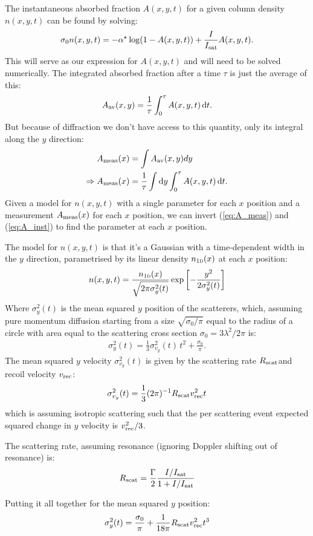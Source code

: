 \documentclass{report}
\begin{document}
The instantaneous absorbed fraction $A(x, y, t)$ for a given column density $n(x, y, t)$ can be found by solving:
\begin{align}\label{eq:A_inst}
\sigma_0 n(x, y, t) = -\alpha^\star\log(1 - A(x,y,t)) + \frac{I}{I_{\rm sat}}A(x,y,t).
\end{align}
This will serve as our expression for $A(x, y, t)$ and will need to be solved numerically.
The integrated absorbed fraction after a time $\tau$ is just the average of this:
\begin{align}
A_{\rm av}(x, y) = \frac1\tau\int_0^\tau A(x, y, t)\,{\rm d}t.
\end{align}
But because of diffraction we don't have access to this quantity, only its integral along the $y$ direction:
\begin{align}
A_{\rm meas}(x) &= \int A_{\rm av}(x, y)dy\\
\Rightarrow A_{\rm meas}(x) & = \frac1\tau\int{\rm d}y\int_0^\tau A(x, y, t)\,{\rm d}t.\label{eq:A_meas}
\end{align}
Given a model for $n(x, y, t)$ with a single parameter for each $x$ position and a measurement $A_{\rm meas}(x)$ for each $x$ position, we can invert (\ref{eq:A_meas}) and (\ref{eq:A_inst}) to find the parameter at each $x$ position.

The model for $n(x, y, t)$ is that it's a Gaussian with a time-dependent width in the $y$ direction, parametrised by its linear density $n_{\textsc{1d}}(x)$ at each $x$ position:
\begin{equation}
n(x, y, t) = \frac{n_{\textsc{1d}}(x)}{\sqrt{2\pi \sigma^2_y(t)}}\exp\left[-\frac{y^2}{2\sigma^2_y(t)}\right]
\end{equation}
Where $\sigma^2_y(t)$ is the mean squared $y$ position of the scatterers, which, assuming pure momentum diffusion starting from a size $\sqrt{\sigma_0/\pi}$ equal to the radius of a circle with area equal to the scattering cross section $\sigma_0 = 3\lambda^2 / {2\pi}$ is:
\begin{align}
\sigma^2_y(t) = \frac13\sigma^2_{v_y}(t)\, t^2 + \frac{\sigma_0}{\pi}.
\end{align}
The mean squared $y$ velocity $\sigma^2_{v_y}(t)$ is given by the scattering rate $R_{\rm scat}$and recoil velocity $v_{\rm rec}$:
\begin{align}
\sigma^2_{v_y}(t) = \frac13 (2\pi)^{-1}R_{\rm scat} v^2_{\rm rec} t
\end{align}
which is assuming isotropic scattering such that the per scattering event expected squared change in $y$ velocity is $v^2_{\rm rec}/3$.

The scattering rate, assuming resonance (ignoring Doppler shifting out of resonance) is:
\begin{align}
R_{\rm scat} = \frac\Gamma2 \frac{I/I_{\rm sat}}{1 + I/I_{\rm sat}}
\end{align}

Putting it all together for the mean squared $y$ position:
\begin{align}
\sigma^2_y(t) = \frac{\sigma_0}{\pi} + \frac1{18\pi} R_{\rm scat} v^2_{\rm rec} t^3
\end{align}
\end{document}
